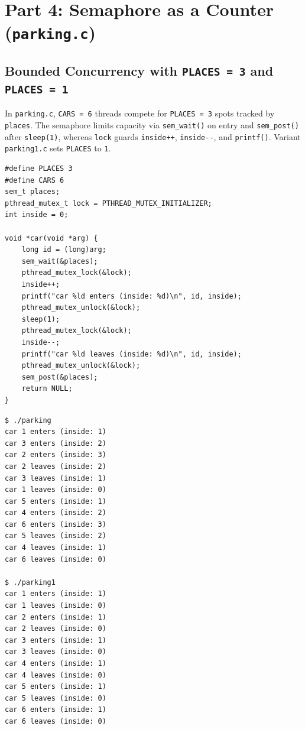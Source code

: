 \documentclass[12pt,a4paper]{article}
\begin{document}
\section{Part 4: Semaphore as a Counter (\texttt{parking.c})}

\subsection{Bounded Concurrency with \texttt{PLACES = 3} and \texttt{PLACES = 1}}
In \texttt{parking.c}, \texttt{CARS = 6} threads compete for \texttt{PLACES = 3} spots tracked by \texttt{places}. The semaphore limits capacity via \texttt{sem\_wait()} on entry and \texttt{sem\_post()} after \texttt{sleep(1)}, whereas \texttt{lock} guards \texttt{inside++}, \texttt{inside-{}-}, and \texttt{printf()}. Variant \texttt{parking1.c} sets \texttt{PLACES} to \texttt{1}.

\begin{lstlisting}[style=cstyle,caption={Bounded parking simulation in \texttt{parking.c}}]
#define PLACES 3
#define CARS 6
sem_t places;
pthread_mutex_t lock = PTHREAD_MUTEX_INITIALIZER;
int inside = 0;

void *car(void *arg) {
    long id = (long)arg;
    sem_wait(&places);
    pthread_mutex_lock(&lock);
    inside++;
    printf("car %ld enters (inside: %d)\n", id, inside);
    pthread_mutex_unlock(&lock);
    sleep(1);
    pthread_mutex_lock(&lock);
    inside--;
    printf("car %ld leaves (inside: %d)\n", id, inside);
    pthread_mutex_unlock(&lock);
    sem_post(&places);
    return NULL;
}
\end{lstlisting}

\begin{lstlisting}[style=consolestyle]
$ ./parking
car 1 enters (inside: 1)
car 3 enters (inside: 2)
car 2 enters (inside: 3)
car 2 leaves (inside: 2)
car 3 leaves (inside: 1)
car 1 leaves (inside: 0)
car 5 enters (inside: 1)
car 4 enters (inside: 2)
car 6 enters (inside: 3)
car 5 leaves (inside: 2)
car 4 leaves (inside: 1)
car 6 leaves (inside: 0)

$ ./parking1
car 1 enters (inside: 1)
car 1 leaves (inside: 0)
car 2 enters (inside: 1)
car 2 leaves (inside: 0)
car 3 enters (inside: 1)
car 3 leaves (inside: 0)
car 4 enters (inside: 1)
car 4 leaves (inside: 0)
car 5 enters (inside: 1)
car 5 leaves (inside: 0)
car 6 enters (inside: 1)
car 6 leaves (inside: 0)
\end{lstlisting}
\end{document}
